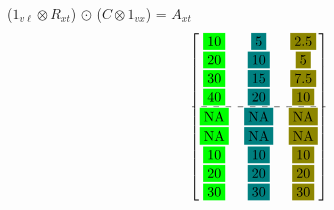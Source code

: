 \documentclass[english]{beamer}
\begin{document}
\begin{frame}{(\(1_{v\ell} \otimes R_{xt}\)) \(\odot\) (\(C \otimes 1_{vx}\)) = $A_{xt}$}
\[\begin{bmatrix}
\fcolorbox{white}{green}{10} & \fcolorbox{white}{teal}{5} & \fcolorbox{white}{olive}{2.5} \\
\fcolorbox{white}{green}{20} & \fcolorbox{white}{teal}{10} & \fcolorbox{white}{olive}{5} \\
\fcolorbox{white}{green}{30} & \fcolorbox{white}{teal}{15} & \fcolorbox{white}{olive}{7.5} \\
\fcolorbox{white}{green}{40} & \fcolorbox{white}{teal}{20} & \fcolorbox{white}{olive}{10} \\ \hdashline
\fcolorbox{white}{green}{NA} & \fcolorbox{white}{teal}{NA} & \fcolorbox{white}{olive}{NA} \\
\fcolorbox{white}{green}{NA} & \fcolorbox{white}{teal}{NA} & \fcolorbox{white}{olive}{NA} \\
\fcolorbox{white}{green}{10} & \fcolorbox{white}{teal}{10} & \fcolorbox{white}{olive}{10} \\
\fcolorbox{white}{green}{20} & \fcolorbox{white}{teal}{20} & \fcolorbox{white}{olive}{20} \\
\fcolorbox{white}{green}{30} & \fcolorbox{white}{teal}{30} & \fcolorbox{white}{olive}{30} \\
\end{bmatrix}
\]
\end{frame}
\end{document}
